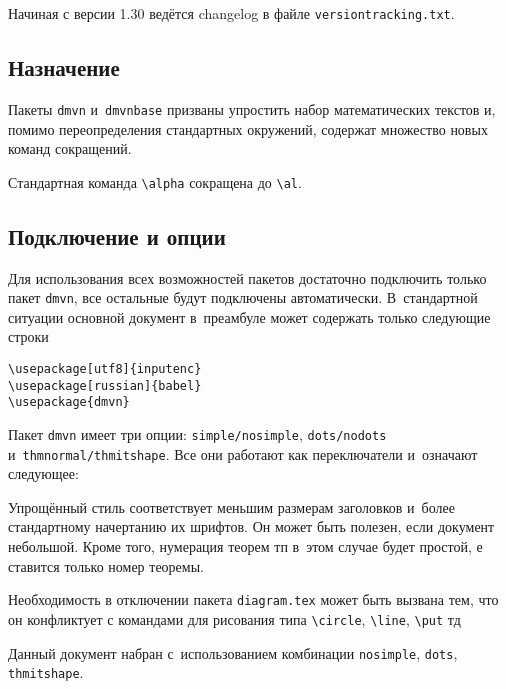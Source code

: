 \documentclass[a4paper]{article}
\newcommand{\pkgdmvn}{\texttt{dmvn}}
\newcommand{\pkgbase}{\texttt{dmvnbase}}
\begin{document}
Начиная с версии 1.30 ведётся changelog в файле \texttt{versiontracking.txt}.

\subsection{Назначение}
Пакеты \pkgdmvn{} и~\pkgbase{} призваны упростить набор математических текстов и, помимо
переопределения стандартных окружений, содержат множество новых команд сокращений.

\begin{ex}
Стандартная команда \verb'\alpha' сокращена до \verb'\al'.
\end{ex}

\subsection{Подключение и опции}
Для использования всех возможностей пакетов достаточно подключить только пакет \pkgdmvn{},
все остальные будут подключены автоматически. В~стандартной ситуации основной документ
в~преамбуле может содержать только следующие строки
\begin{verbatim}
\usepackage[utf8]{inputenc}
\usepackage[russian]{babel}
\usepackage{dmvn}
\end{verbatim}

Пакет \pkgdmvn{} имеет три опции: \verb'simple/nosimple', \verb'dots/nodots'
и~\verb'thmnormal/thmitshape'. Все они работают как переключатели и~означают следующее:

Упрощённый стиль соответствует меньшим размерам заголовков и~более стандартному начертанию их шрифтов.
Он может быть полезен, если документ небольшой. Кроме того, нумерация теорем тп в~этом случае
будет простой, е ставится только номер теоремы.

Необходимость в отключении пакета \texttt{diagram.tex} может быть вызвана тем, что
он конфликтует с командами для рисования типа \verb'\circle', \verb'\line', \verb'\put' тд

Данный документ набран с~использованием
комбинации \texttt{nosimple}, \texttt{dots}, \texttt{thmitshape}.
\end{document}
